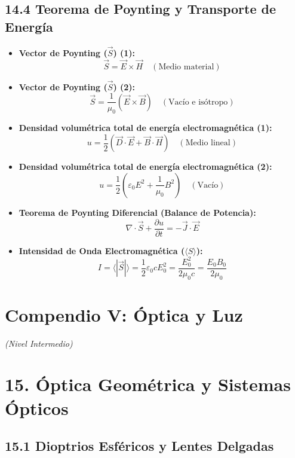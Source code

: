 \documentclass[11pt,a4paper]{article}
\begin{document}
\subsection*{14.4 Teorema de Poynting y Transporte de Energía}

\begin{itemize}
  \item \textbf{Vector de Poynting ($\vec{S}$) (1):}
  \[
    \vec{S} = \vec{E} \times \vec{H} \quad (\text{Medio material})
  \]
  \item \textbf{Vector de Poynting ($\vec{S}$) (2):}
  \[
    \vec{S} = \frac{1}{\mu_0}(\vec{E} \times \vec{B}) \quad (\text{Vacío e isótropo})
  \]
  \item \textbf{Densidad volumétrica total de energía electromagnética (1):}
  \[
    u = \frac{1}{2} (\vec{D} \cdot \vec{E} + \vec{B} \cdot \vec{H}) \quad (\text{Medio lineal})
  \]
  \item \textbf{Densidad volumétrica total de energía electromagnética (2):}
  \[
    u = \frac{1}{2} \left( \varepsilon_0 E^2 + \frac{1}{\mu_0} B^2 \right) \quad (\text{Vacío})
  \]
  \item \textbf{Teorema de Poynting Diferencial (Balance de Potencia):}
  \[
    \nabla \cdot \vec{S} + \frac{\partial u}{\partial t} = -\vec{J} \cdot \vec{E}
  \]
  \item \textbf{Intensidad de Onda Electromagnética ($\langle S \rangle$):}
  \[
    I = \langle |\vec{S}| \rangle = \frac{1}{2} \varepsilon_0 c E_0^2 = \frac{E_0^2}{2 \mu_0 c} = \frac{E_0 B_0}{2\mu_0}
  \]
\end{itemize}

\section*{Compendio V: Óptica y Luz}

\textit{(Nivel Intermedio)}

\section*{15. Óptica Geométrica y Sistemas Ópticos}

\subsection*{15.1 Dioptrios Esféricos y Lentes Delgadas}
\end{document}
